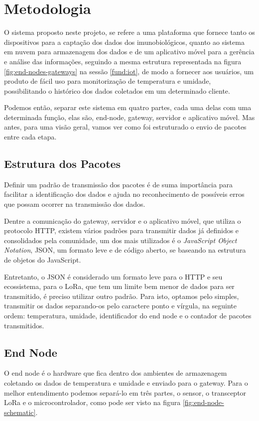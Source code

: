 \chapter{Metodologia}
\label{cap:metodologia}
O sistema proposto neste projeto, se refere a uma plataforma que fornece tanto os dispositivos para a captação dos dados dos imunobiológicos, quanto ao sistema em nuvem para armazenagem dos dados e de um aplicativo móvel para a gerência e análise das informações, seguindo a mesma estrutura representada na figura \ref{fig:end-nodes-gateways} na sessão \ref{fund:iot}, de modo a fornecer aos usuários, um produto  de fácil uso para monitorização de temperatura e umidade, possibilitando o histórico dos dados coletados em um determinado cliente.

Podemos então, separar este sistema em quatro partes, cada uma delas com uma determinada função, elas são, end-node, gateway, servidor e aplicativo móvel. Mas antes, para uma visão geral, vamos ver como foi estruturado o envio de pacotes entre cada etapa.

\section{Estrutura dos Pacotes}
\label{metod:pacotes}
Definir um padrão de transmissão dos pacotes é de suma importância para facilitar a identificação dos dados e ajuda no reconhecimento de possíveis erros que possam ocorrer na transmissão dos dados.

Dentre a comunicação do gateway, servidor e o aplicativo móvel, que utiliza o protocolo HTTP, existem vários padrões para transmitir dados já definidos e consolidados pela comunidade,  um dos mais utilizados é o \textit{JavaScript Object Notation}, JSON, um formato leve e de código aberto, se baseando na estrutura de objetos do JavaScript.

Entretanto, o JSON é considerado um formato leve para o HTTP e seu ecossistema, para o LoRa, que tem um limite bem menor de dados para ser transmitido, é preciso utilizar outro padrão. Para isto, optamos pelo simples, transmitir os dados separando-os pelo caractere ponto e vírgula, na seguinte ordem: temperatura, umidade, identificador do end node e o contador de pacotes transmitidos.

\section{End Node}
\label{metod:node}
O end node é o hardware que fica dentro dos ambientes de armazenagem coletando os dados de temperatura e umidade e enviado para o gateway. Para o melhor entendimento podemos separá-lo em três partes, o sensor, o transceptor LoRa e o microcontrolador, como pode ser visto na figura \ref{fig:end-node-schematic}.

